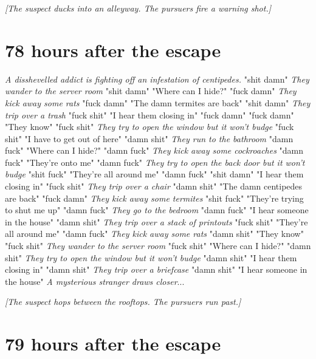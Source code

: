 \documentclass{report}
\begin{document}
\textit{[The suspect ducks into an alleyway. The pursuers fire a warning shot.]}


\section*{78 \small{hours after the escape}}

\textit{A disshevelled addict is fighting off an infestation of centipedes.} "shit damn" \textit{They wander to the server room} "shit damn" "Where can I hide?" "fuck damn" \textit{They kick away some rats} "fuck damn" "The damn termites are back" "shit damn" \textit{They trip over a trash} "fuck shit" "I hear them closing in" "fuck damn" \textit{} "fuck damn" "They know" "fuck shit" \textit{They try to open the window but it won't budge} "fuck shit" "I have to get out of here" "damn shit" \textit{They run to the bathroom} "damn fuck" "Where can I hide?" "damn fuck" \textit{They kick away some cockroaches} "damn fuck" "They're onto me" "damn fuck" \textit{They try to open the back door but it won't budge} "shit fuck" "They're all around me" "damn fuck" \textit{} "shit damn" "I hear them closing in" "fuck shit" \textit{They trip over a chair} "damn shit" "The damn centipedes are back" "fuck damn" \textit{They kick away some termites} "shit fuck" "They're trying to shut me up" "damn fuck" \textit{They go to the bedroom} "damn fuck" "I hear someone in the house" "damn shit" \textit{They trip over a stack of printouts} "fuck shit" "They're all around me" "damn fuck" \textit{They kick away some rats} "damn shit" "They know" "fuck shit" \textit{They wander to the server room} "fuck shit" "Where can I hide?" "damn shit" \textit{They try to open the window but it won't budge} "damn shit" "I hear them closing in" "damn shit" \textit{They trip over a briefcase} "damn shit" "I hear someone in the house" \textit{A mysterious stranger draws closer}...

\textit{[The suspect hops between the rooftops. The pursuers run past.]}


\section*{79 \small{hours after the escape}}
\end{document}
